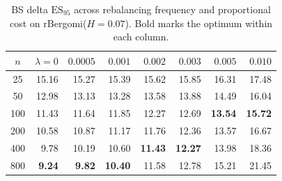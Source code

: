 \begin{table}[h]
\centering
\small
\caption{BS delta $\mathrm{ES}_{95}$ across rebalancing frequency and proportional cost on rBergomi($H{=}0.07$). Bold marks the optimum within each column.}
\label{tab:h2_grid}
\begin{tabular}{c|rrrrrrr}
\hline
$n$ & $\lambda{=}0$ & $0.0005$ & $0.001$ & $0.002$ & $0.003$ & $0.005$ & $0.010$ \\
\hline
25 & 15.16 & 15.27 & 15.39 & 15.62 & 15.85 & 16.31 & 17.48 \\
50 & 12.98 & 13.13 & 13.28 & 13.58 & 13.88 & 14.49 & 16.04 \\
100 & 11.43 & 11.64 & 11.85 & 12.27 & 12.69 & \textbf{13.54} & \textbf{15.72} \\
200 & 10.58 & 10.87 & 11.17 & 11.76 & 12.36 & 13.57 & 16.67 \\
400 & 9.78 & 10.19 & 10.60 & \textbf{11.43} & \textbf{12.27} & 13.98 & 18.36 \\
800 & \textbf{9.24} & \textbf{9.82} & \textbf{10.40} & 11.58 & 12.78 & 15.21 & 21.45 \\
\hline
\end{tabular}
\end{table}